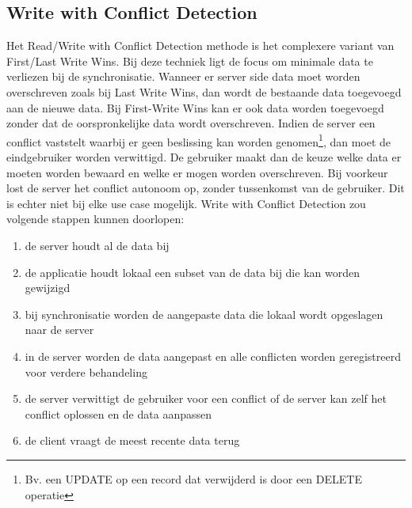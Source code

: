 \subsection{Write with Conflict Detection}
\label{subsec: conflict-detection}
Het Read/Write with Conflict Detection methode is het complexere variant van First/Last Write Wins. Bij deze techniek ligt de focus om minimale data te verliezen bij de synchronisatie. Wanneer er server side data moet worden overschreven zoals bij Last Write Wins, dan wordt de bestaande data toegevoegd aan de nieuwe data. Bij First-Write Wins kan er ook data worden toegevoegd zonder dat de oorspronkelijke data wordt overschreven. Indien de server een conflict vaststelt waarbij er geen beslissing kan worden genomen\footnote{Bv. een UPDATE op een record dat verwijderd is door een DELETE operatie}, dan moet de eindgebruiker worden verwittigd. De gebruiker maakt dan de keuze welke data er moeten worden bewaard en welke er mogen worden overschreven. Bij voorkeur lost de server het conflict autonoom op, zonder tussenkomst van de gebruiker. Dit is echter niet bij elke use case mogelijk. 
Write with Conflict Detection zou volgende stappen kunnen doorlopen: 
\begin{enumerate}
\item de server houdt al de data bij
\item de applicatie houdt lokaal een subset van de data bij die kan worden gewijzigd
\item bij synchronisatie worden de aangepaste data die lokaal wordt opgeslagen naar de server
\item in de server worden de data aangepast en alle conflicten worden geregistreerd voor verdere behandeling
\item de server verwittigt de gebruiker voor een conflict of de server kan zelf het conflict oplossen en de data aanpassen
\item de client vraagt de meest recente data terug
\end{enumerate}